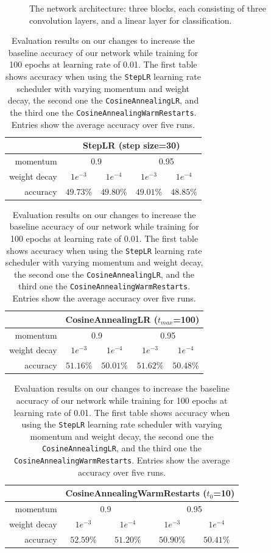 \begin{figure}
    \caption{The network architecture: three blocks, each consisting of three convolution layers, and a linear layer for classification.}
    \label{fig:net}
\end{figure}

\onecolumn

\begin{table}
    \centering
    \begin{tabular}{|r|c|c|c|c|}
    \hline
                    & \multicolumn{4}{|c|}{StepLR (step size=30)}            \\ \hline
    momentum        & \multicolumn{2}{|c|}{0.9} & \multicolumn{2}{|c|}{0.95}\\ \hline
    weight decay    & $1e^{-3}$ & $1e^{-4}$     & $1e^{-3}$ & $1e^{-4}$     \\ \hline
    accuracy        & $49.73\%$ & $49.80\%$     & $49.01\%$ & $ 48.85\%$    \\ \hline
    \end{tabular}
    
    \bigskip
    \begin{tabular}{|r|c|c|c|c|}
    \hline
                    & \multicolumn{4}{|c|}{CosineAnnealingLR ($t_{max}$=100)}            \\ \hline
    momentum        & \multicolumn{2}{|c|}{0.9} & \multicolumn{2}{|c|}{0.95}\\ \hline
    weight decay    & $1e^{-3}$ & $1e^{-4}$     & $1e^{-3}$ & $1e^{-4}$     \\ \hline
    accuracy        & $51.16\%$ & $50.01\%$     & $51.62\%$ & $50.48\%$    \\ \hline
    \end{tabular}
        
    \bigskip
    \begin{tabular}{|r|c|c|c|c|}
    \hline
                    & \multicolumn{4}{|c|}{CosineAnnealingWarmRestarts ($t_0$=10)}            \\ \hline
    momentum        & \multicolumn{2}{|c|}{0.9} & \multicolumn{2}{|c|}{0.95}\\ \hline
    weight decay    & $1e^{-3}$ & $1e^{-4}$     & $1e^{-3}$ & $1e^{-4}$     \\ \hline
    accuracy        & $52.59\%$ & $51.20\%$     & $50.90\%$ & $50.41\%$    \\ \hline
    \end{tabular}
    \caption{Evaluation results on our changes to increase the baseline accuracy of our network while training for 100 epochs at learning rate of 0.01. The first table shows accuracy when using the \texttt{StepLR} learning rate scheduler with varying momentum and weight decay, the second one the \texttt{CosineAnnealingLR}, and the third one the \texttt{CosineAnnealingWarmRestarts}. Entries show the average accuracy over five runs.}
    \label{tab:baseexp}
\end{table}{}